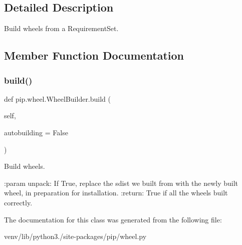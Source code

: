 \subsection{Detailed Description}
\begin{DoxyVerb}Build wheels from a RequirementSet.\end{DoxyVerb}
 

\subsection{Member Function Documentation}
\mbox{\label{classpip_1_1wheel_1_1_wheel_builder_a7dcc1d58cea783d03347132deb3b11fd}} 
\subsubsection{\texorpdfstring{build()}{build()}}
{\footnotesize\ttfamily def pip.\+wheel.\+Wheel\+Builder.\+build (\begin{DoxyParamCaption}\item[{}]{self,  }\item[{}]{autobuilding = {\ttfamily False} }\end{DoxyParamCaption})}

\begin{DoxyVerb}Build wheels.

:param unpack: If True, replace the sdist we built from with the
    newly built wheel, in preparation for installation.
:return: True if all the wheels built correctly.
\end{DoxyVerb}
 

The documentation for this class was generated from the following file\+:\begin{DoxyCompactItemize}
\item 
venv/lib/python3./site-\/packages/pip/wheel.\+py\end{DoxyCompactItemize}
